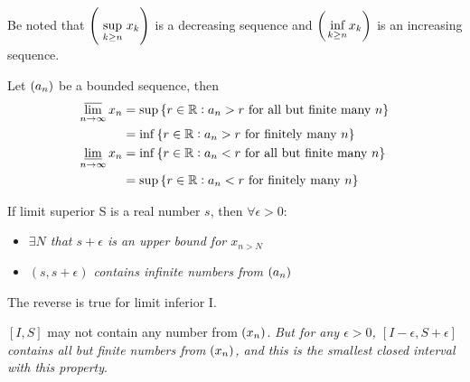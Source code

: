 Be noted that $\sequence{\underset{k \geq n}{\text{ sup }} x_k}$ is a decreasing sequence and $\sequence{\underset{k \geq n}{\text{ inf }} x_k}$ is an increasing sequence.


\begin{theorem}\label{definition_of_limit_superium_infinium}
    Let $\sequence{a_n}$ be a bounded sequence, then
    \begin{equation}
        \begin{aligned}
            \varlimsup_{n\rightarrow \infty} x_n &= \sup \set{r \in \mathbb{R}: a_n > r \text{ for all but finite many } n} \\
            &= \inf \set{r \in \mathbb{R}: a_n > r \text{ for finitely many } n} \\
            \varliminf_{n\rightarrow \infty} x_n &= \inf \set{r \in \mathbb{R}: a_n < r \text{ for all but finite many } n} \\
            &= \sup \set{r \in \mathbb{R}: a_n < r \text{ for finitely many } n} 
        \end{aligned}
    \end{equation}

    
    If limit superior S is a real number $s$, then $\forall \epsilon > 0$:
    \begin{itemize}
        \item \emph{$\exists N$ that $s + \epsilon$ is an upper bound for $x_{n > N}$}
        \item \emph{$(s, s+\epsilon)$ contains infinite numbers from $\sequence{a_n}$}
    \end{itemize} 
    
    The reverse is true for limit inferior I.
 
    $[I,S]$ may not contain any number from $\sequence{x_n}$. \emph{But for any $\epsilon >0$, $[I - \epsilon, S + \epsilon]$ contains all but finite numbers from $\sequence{x_n}$, and this is the smallest closed interval with this property}.
\end{theorem}

